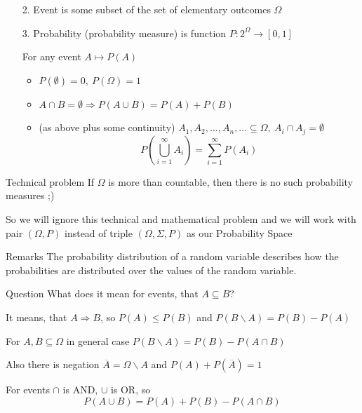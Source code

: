 \documentclass[fullscreen=true, bookmarks=true, hyperref={pdfencoding=unicode}]{beamer}
\begin{document}
\begin{frame}
  \begin{enumerate}
    \item[2.] Event is some subset of the set of elementary outcomes $\Omega$
    \item[3.] Probability (probability measure) is function $P: 2^\Omega \to [0,1]$
    
    \pause For any event $A \mapsto P(A)$
    \begin{itemize}
      \pause\item $P(\emptyset) = 0,\ P(\Omega) = 1$
      \pause\item $A \cap B = \emptyset \Rightarrow P(A \cup B) = P(A) + P(B)$
      \pause\item (as above plus some continuity) $A_1, A_2, \ldots, A_n, \ldots \subseteq \Omega,\  A_i \cap A_j = \emptyset$
      $$ P(\bigcup\limits_{i=1}^{\infty} A_i) = \sum\limits_{i=1}^{\infty} P(A_i) $$
    \end{itemize}
  \end{enumerate}

  \pause
  \begin{block}{Technical problem}
    If $\Omega$ is more than countable, then there is no such probability measures ;)
  \end{block}
  So we will ignore this technical and mathematical problem 
  and we will work with pair $(\Omega, P)$ instead of triple $(\Omega, \Sigma, P)$ 
  as our Probability Space
\end{frame}


\begin{frame}{Remarks}
  The probability distribution of a random variable describes how the probabilities 
  are distributed over the values of the random variable.

  \pause
  \vspace{0.5cm}
  \begin{block}{Question}
    What does it mean for events, that $A \subseteq B$?
  \end{block}

  \pause
  \vspace{0.5cm}
  It means, that $A \Rightarrow B$, so $P(A) \leq P(B)$ and 
  $P(B \backslash A) = P(B)-P(A)$

  For $A, B \subseteq \Omega$ in general case $P(B \backslash A) = P(B)-P(A\cap B)$

  \pause
  \vspace{0.5cm}
  Also there is negation $ \overline{A}  = \Omega \backslash A$ and $P(A) + P(\overline{A}) = 1$

  For events $\cap$ is AND, $\cup$ is OR, so
  $$P(A\cup B) = P(A)+P(B)-P(A\cap B)$$

\end{frame}
\end{document}
